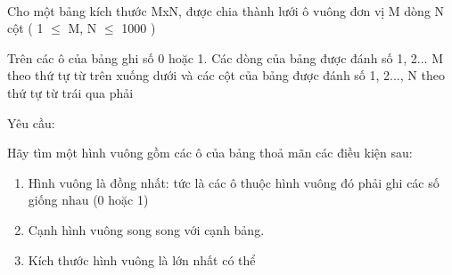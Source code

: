  

Cho một bảng kích thước MxN, được chia thành lưới ô vuông đơn vị M dòng N cột ( 1  $\le$  M, N  $\le$  1000 )

Trên các ô của bảng ghi số 0 hoặc 1. Các dòng của bảng được đánh số 1, 2... M theo thứ tự từ trên xuống dưới và các cột của bảng được đánh số 1, 2..., N theo thứ tự từ trái qua phải

Yêu cầu:

Hãy tìm một hình vuông gồm các ô của bảng thoả mãn các điều kiện sau:
\begin{enumerate}
	\item Hình vuông là đồng nhất: tức là các ô thuộc hình vuông đó phải ghi các số giống nhau (0 hoặc 1)
	\item Cạnh hình vuông song song với cạnh bảng.
	\item Kích thước hình vuông là lớn nhất có thể
\end{enumerate}

\